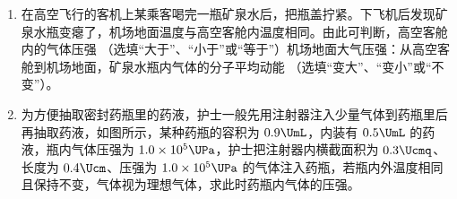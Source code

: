 \documentclass[\gkver]{gaokaozhenti}
\begin{document}
\begin{enumerate}
{	$B_{1}ev_{m}=m\frac{v_{m}^{2}}{r_{m}}$

	$2eU=\frac{1}{2}mv_{m}^{2}-keU$

	联立解得

	$k=\frac{13}{6}$
}

\item
在高空飞行的客机上某乘客喝完一瓶矿泉水后，把瓶盖拧紧。下飞机后发现矿泉水瓶变瘪了，机场地面温度与高空客舱内温度相同。由此可判断，高空客舱内的气体压强 （选填“大于”、“小于”或“等于”）机场地面大气压强：从高空客舱到机场地面，矿泉水瓶内气体的分子平均动能 （选填“变大”、“变小”或“不变”）。


\item
为方便抽取密封药瓶里的药液，护士一般先用注射器注入少量气体到药瓶里后再抽取药液，如图所示，某种药瓶的容积为 $0.9\UmL$，内装有 $0.5\UmL$ 的药液，瓶内气体压强为 $1.0\times10^{5}\UPa$，护士把注射器内横截面积为 $0.3\Ucmq$、长度为 $0.4\Ucm$、压强为 $1.0\times10^{5}\UPa$ 的气体注入药瓶，若瓶内外温度相同且保持不变，气体视为理想气体，求此时药瓶内气体的压强。


\end{enumerate}
\end{document}
